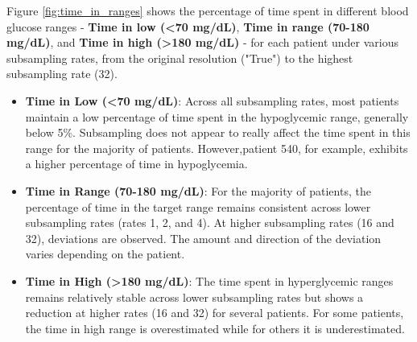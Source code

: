Figure \ref{fig:time_in_ranges} shows the percentage of time spent in different blood glucose ranges - \textbf{Time in low (<70 mg/dL)}, \textbf{Time in range (70-180 mg/dL)},  and \textbf{Time in high (>180 mg/dL)} - for each patient under various subsampling rates, from the original resolution ("True") to the highest subsampling rate (32). 
\begin{itemize}
	\item \textbf{Time in Low (<70 mg/dL)}: Across all subsampling rates, most patients maintain a low percentage of time spent in the hypoglycemic range, generally below 5\%. Subsampling does not appear to really affect the time spent in this range for the majority of patients. However,patient 540, for example, exhibits a higher percentage of time in hypoglycemia.
	\item \textbf{Time in Range (70-180 mg/dL)}: For the majority of patients, the percentage of time in the target range remains consistent across lower subsampling rates (rates 1, 2, and 4). At higher subsampling rates (16 and 32), deviations are observed. The amount and direction of the deviation varies depending on the patient. 
	\item \textbf{Time in High (>180 mg/dL)}: The time spent in hyperglycemic ranges remains relatively stable across lower subsampling rates but shows a reduction at higher rates (16 and 32) for several patients. For some patients, the time in high range is overestimated while for others it is underestimated.
\end{itemize}




